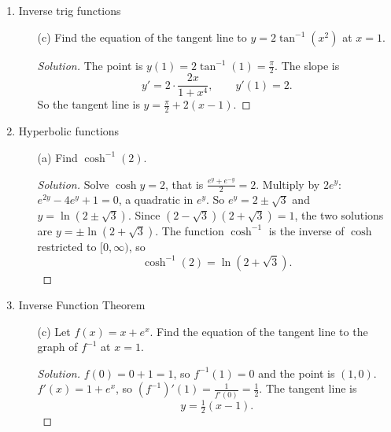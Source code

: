 \documentclass[12pt]{article}
\newenvironment{solution}
  {\renewcommand\qedsymbol{$\blacksquare$}\begin{proof}[Solution]}
  {\end{proof}}
\begin{document}
\begin{enumerate}
\begin{enumerate}
\begin{solution}
Inverse: set $y=3-e^{-x}$ and solve for $x$. Then $e^{-x}=3-y$, so $x=-\ln(3-y)$. Swapping names,
\[ f^{-1}(x)=-\ln(3-x), \]
with domain $(-\infty,3)$ (the range of $f$) and range $(-\infty,\infty)$ (the domain of $f$).

As $x\to\infty$, $e^{-x}\to0$ so $f(x)\to3$. The line $y=3$ is a horizontal asymptote.
\end{solution}


\end{enumerate}

\setcounter{enumi}{3}
\item Inverse trig functions
\begin{enumerate}


\item[(c)] Find the equation of the tangent line to $y=2\tan^{-1}(x^2)$ at $x=1$.
\begin{solution}
The point is $y(1)=2\tan^{-1}(1)=\frac{\pi}{2}$. The slope is
\[ y'=2\cdot\frac{2x}{1+x^4}, \qquad y'(1)=2. \]
So the tangent line is $y=\frac{\pi}{2}+2(x-1)$.
\end{solution}



\end{enumerate}

\setcounter{enumi}{4}
\item Hyperbolic functions
\begin{enumerate}
\item[(a)] Find $\cosh^{-1}(2)$.
\begin{solution}
Solve $\cosh y=2$, that is $\frac{e^y+e^{-y}}{2}=2$. Multiply by $2e^y$: $e^{2y}-4e^y+1=0$, a quadratic in $e^y$. So $e^y=2\pm\sqrt3$ and $y=\ln(2\pm\sqrt3)$. Since $(2-\sqrt3)(2+\sqrt3)=1$, the two solutions are $y=\pm\ln(2+\sqrt3)$. The function $\cosh^{-1}$ is the inverse of $\cosh$ restricted to $[0,\infty)$, so
\[ \cosh^{-1}(2)=\ln(2+\sqrt3). \]
\end{solution}





\end{enumerate}

\setcounter{enumi}{5}
\item Inverse Function Theorem
\begin{enumerate}


\item[(c)] Let $f(x)=x+e^x$. Find the equation of the tangent line to the graph of $f^{-1}$ at $x=1$.
\begin{solution}
$f(0)=0+1=1$, so $f^{-1}(1)=0$ and the point is $(1,0)$. $f'(x)=1+e^x$, so $(f^{-1})'(1)=\frac{1}{f'(0)}=\frac12$. The tangent line is
\[ y=\tfrac12(x-1). \]
\end{solution}



\end{enumerate}
\end{enumerate}
\end{document}
